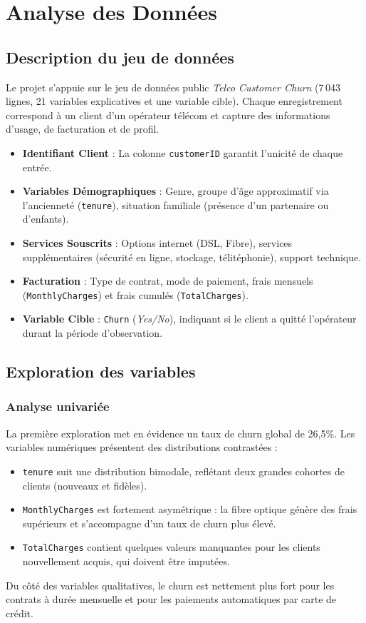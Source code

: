 \chapter{Analyse des Donn\'ees}
\label{chap:analyse_donnees}

\section{Description du jeu de donn\'ees}
Le projet s'appuie sur le jeu de donn\'ees public \textit{Telco Customer Churn} (7\,043 lignes, 21 variables explicatives et une variable cible). Chaque enregistrement correspond \`a un client d'un op\'erateur t\'el\'ecom et capture des informations d'usage, de facturation et de profil.
\begin{itemize}[label=\textcolor{maincolor}{\textbullet}]
    \item \textbf{Identifiant Client} : La colonne \texttt{customerID} garantit l'unicit\'e de chaque entr\'ee.
    \item \textbf{Variables D\'emographiques} : Genre, groupe d'\^age approximatif via l'anciennet\'e (\texttt{tenure}), situation familiale (pr\'esence d'un partenaire ou d'enfants).
    \item \textbf{Services Souscrits} : Options internet (DSL, Fibre), services suppl\'ementaires (s\'ecurit\'e en ligne, stockage, t\'elit\'ephonie), support technique.
    \item \textbf{Facturation} : Type de contrat, mode de paiement, frais mensuels (\texttt{MonthlyCharges}) et frais cumul\'es (\texttt{TotalCharges}).
    \item \textbf{Variable Cible} : \texttt{Churn} (\textit{Yes/No}), indiquant si le client a quitt\'e l'op\'erateur durant la p\'eriode d'observation.
\end{itemize}

\section{Exploration des variables}
\subsection{Analyse univari\'ee}
La premi\`ere exploration met en \'evidence un taux de churn global de 26,5\%. Les variables num\'eriques pr\'esentent des distributions contrast\'ees :
\begin{itemize}
    \item \texttt{tenure} suit une distribution bimodale, refl\'etant deux grandes cohortes de clients (nouveaux et fid\`eles).
    \item \texttt{MonthlyCharges} est fortement asym\'etrique : la fibre optique g\'en\`ere des frais sup\'erieurs et s'accompagne d'un taux de churn plus \'elev\'e.
    \item \texttt{TotalCharges} contient quelques valeurs manquantes pour les clients nouvellement acquis, qui doivent \^etre imput\'ees.
\end{itemize}
Du c\^ot\'e des variables qualitatives, le churn est nettement plus fort pour les contrats \`a dur\'ee mensuelle et pour les paiements automatiques par carte de cr\'edit.


